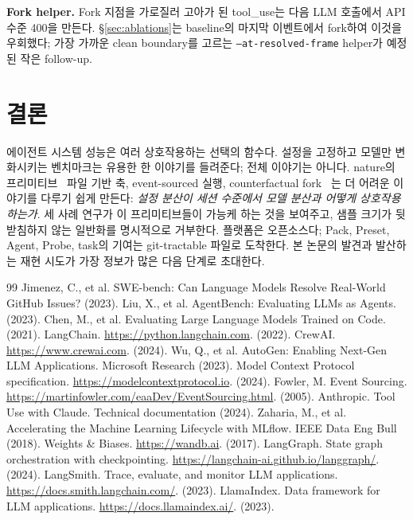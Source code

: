\documentclass[11pt,a4paper]{article}
\begin{document}
\textbf{Fork helper.} Fork 지점을 가로질러 고아가 된 tool\_use는 다음 LLM
호출에서 API 수준 400을 만든다. \S\ref{sec:ablations}는 baseline의 마지막
이벤트에서 fork하여 이것을 우회했다; 가장 가까운 clean boundary를 고르는
\texttt{--at-resolved-frame} helper가 예정된 작은 follow-up.

\section{결론}

에이전트 시스템 성능은 여러 상호작용하는 선택의 함수다. 설정을 고정하고
모델만 변화시키는 벤치마크는 유용한 한 이야기를 들려준다; 전체 이야기는
아니다. nature의 프리미티브 \textemdash\ 파일 기반 축, event-sourced
실행, counterfactual fork \textemdash\ 는 더 어려운 이야기를 다루기
쉽게 만든다: \emph{설정 분산이 세션 수준에서 모델 분산과 어떻게
상호작용하는가}. 세 사례 연구가 이 프리미티브들이 가능케 하는 것을
보여주고, 샘플 크기가 뒷받침하지 않는 일반화를 명시적으로 거부한다.
플랫폼은 오픈소스다; Pack, Preset, Agent, Probe, task의 기여는 git-tractable
파일로 도착한다. 본 논문의 발견과 발산하는 재현 시도가 가장 정보가
많은 다음 단계로 초대한다.


\begin{thebibliography}{99}
 Jimenez, C., et al. SWE-bench: Can Language Models Resolve Real-World GitHub Issues? (2023).
 Liu, X., et al. AgentBench: Evaluating LLMs as Agents. (2023).
 Chen, M., et al. Evaluating Large Language Models Trained on Code. (2021).
 LangChain. \url{https://python.langchain.com}. (2022\textendash).
 CrewAI. \url{https://www.crewai.com}. (2024\textendash).
 Wu, Q., et al. AutoGen: Enabling Next-Gen LLM Applications. Microsoft Research (2023).
 Model Context Protocol specification. \url{https://modelcontextprotocol.io}. (2024\textendash).
 Fowler, M. Event Sourcing. \url{https://martinfowler.com/eaaDev/EventSourcing.html}. (2005).
 Anthropic. Tool Use with Claude. Technical documentation (2024).
 Zaharia, M., et al. Accelerating the Machine Learning Lifecycle with MLflow. IEEE Data Eng Bull (2018).
 Weights \& Biases. \url{https://wandb.ai}. (2017\textendash).
 LangGraph. State graph orchestration with checkpointing. \url{https://langchain-ai.github.io/langgraph/}. (2024\textendash).
 LangSmith. Trace, evaluate, and monitor LLM applications. \url{https://docs.smith.langchain.com/}. (2023\textendash).
 LlamaIndex. Data framework for LLM applications. \url{https://docs.llamaindex.ai/}. (2023\textendash).
\end{thebibliography}
\end{document}
